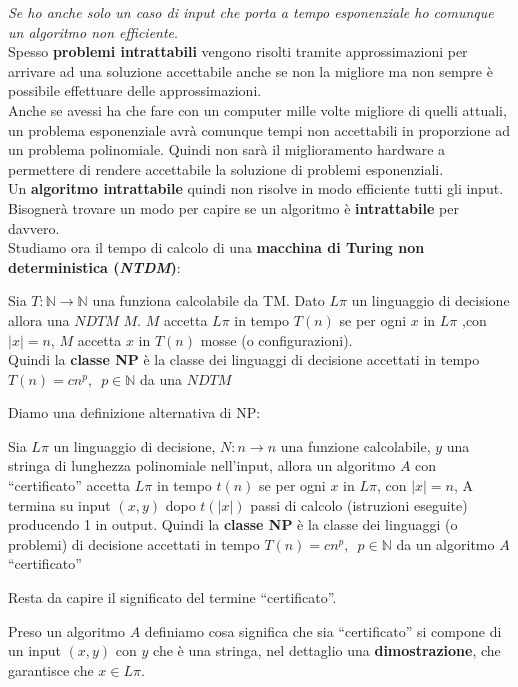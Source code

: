 \documentclass[a4paper,12pt, oneside]{book}
\begin{document}
\textit{Se ho anche solo un caso di input che porta a tempo esponenziale ho
  comunque un algoritmo non efficiente}.\\
Spesso \textbf{problemi intrattabili} vengono risolti tramite approssimazioni
per arrivare ad una soluzione accettabile anche se non la migliore ma non sempre
è possibile effettuare delle approssimazioni.\\
Anche se avessi ha che fare con un computer mille volte migliore di quelli
attuali, un problema esponenziale avrà comunque tempi non accettabili in
proporzione ad un problema polinomiale. Quindi non sarà il miglioramento
hardware a permettere di rendere accettabile la soluzione di problemi
esponenziali.\\
Un \textbf{algoritmo intrattabile} quindi non risolve in modo efficiente tutti
gli input. Bisognerà trovare un modo per capire se un algoritmo è
\textbf{intrattabile} per davvero.\\
Studiamo ora il tempo di calcolo di una \textbf{macchina di Turing non
  deterministica (\textit{NTDM})}:
\begin{definizione}
  Sia $T:\mathbb{N}\to\mathbb{N}$ una funziona calcolabile da TM. Dato $L\pi$ un
  linguaggio di decisione allora una $NDTM$ $M$. $M$ accetta $L\pi$ in tempo
  $T(n)$ se per ogni $x$ in $L\pi$ ,con $|x|=n$,  $M$ accetta $x$ in $T(n)$
  mosse (o configurazioni).\\
  Quindi la \textbf{classe NP} è la classe dei linguaggi di decisione accettati
  in tempo $T(n)=cn^p,\,\,\,p\in \mathbb{N}$ da una $NDTM$
\end{definizione}
Diamo una definizione alternativa di NP:
\begin{definizione}
  Sia $L\pi$ un linguaggio di decisione, $N:n\to n$ una funzione calcolabile,
  $y$ una stringa di lunghezza polinomiale nell'input, allora un algoritmo $A$
  con ``certificato'' accetta $L\pi$ in tempo $t(n)$ se per ogni $x$ in $L\pi$,
  con $|x|=n$, A termina su input $(x,y)$ dopo $t(|x|)$ passi di calcolo
  (istruzioni eseguite) producendo 1 in output.
  Quindi la \textbf{classe NP} è la classe dei linguaggi (o problemi) di
  decisione accettati in tempo $T(n)=cn^p,\,\,\,p\in\mathbb{N}$ da un algoritmo
  $A$ ``certificato''
\end{definizione}
Resta da capire il significato del termine ``certificato''.
\begin{definizione}
  Preso un algoritmo $A$ definiamo cosa significa che sia ``certificato'' si
  compone di un input $(x,y)$ con $y$ che è una stringa, nel dettaglio una
  \textbf{dimostrazione}, che garantisce che $x\in L\pi$.
\end{definizione}
\end{document}

